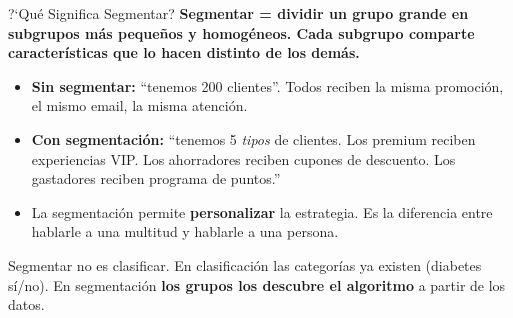 \documentclass[aspectratio=169, 11pt]{beamer}
\begin{document}
\begin{frame}{?`Qu\'e Significa Segmentar?}
  \vspace{-4pt}
  {\footnotesize\color{arcaDark}\bfseries
    Segmentar = dividir un grupo grande en \textbf{subgrupos m\'as
    peque\~nos y homog\'eneos}. Cada subgrupo comparte caracter\'isticas
    que lo hacen distinto de los dem\'as.}

  \vspace{8pt}
  {\footnotesize
  \begin{itemize}\setlength{\itemsep}{5pt}
    \item[{\color{arcaRed}\scriptsize\faArrowRight}]
      \textbf{Sin segmentar:} ``tenemos 200 clientes''. Todos reciben
      la misma promoci\'on, el mismo email, la misma atenci\'on.
    \item[{\color{codeGreen}\scriptsize\faArrowRight}]
      \textbf{Con segmentaci\'on:} ``tenemos 5 \textit{tipos} de clientes.
      Los premium reciben experiencias VIP. Los ahorradores reciben
      cupones de descuento. Los gastadores reciben programa de puntos.''
    \item[{\color{codeGreen}\scriptsize\faArrowRight}]
      La segmentaci\'on permite \textbf{personalizar} la estrategia.
      Es la diferencia entre hablarle a una multitud y hablarle
      a una persona.
  \end{itemize}
  }

  \vspace{4pt}
  {\scriptsize\color{textMuted}
    \faLightbulb\hspace{4pt} Segmentar no es clasificar. En clasificaci\'on
    las categor\'ias ya existen (diabetes s\'i/no). En segmentaci\'on
    \textbf{los grupos los descubre el algoritmo} a partir de los datos.}
\end{frame}
\end{document}
